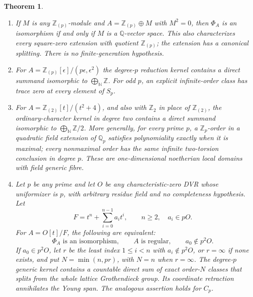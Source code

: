 \documentclass[11pt,a4paper]{article}
\newtheorem{theorem}{Theorem}[section]
\theoremstyle{definition}\newtheorem{definition}[theorem]{Definition}
\theoremstyle{remark}\newtheorem{remark}[theorem]{Remark}
\newcommand{\Z}{\mathbb Z}\newcommand{\Q}{\mathbb Q}
\begin{document}
\begin{theorem}
\begin{enumerate}[label=\textup{(\roman*)}]
degree-$p$ reduction and generic kernels, detected by an additive
homomorphism annihilating the Young span
(Corollary~\ref{thm:all-dvr-odd-dual}).  No split-summand conclusion
is asserted by that unrestricted theorem.
For every $n\ge2$ and $O=\Z_{(p)}$ or $\Z_p$, the degree-$p$
reduction kernel for $O[e]/(e^n)$ contains a split countable direct
sum of copies of $\Z/n$.  The explicit cyclic classes and their
inductions have exact order $n$ and vanish after inverting $p$.  More generally, for any mixed-characteristic DVR $O$ with
$h=v_O(p)$, the same split conclusion holds when $(n,h)=1$,
and generation fails whenever $n\nmid h$.
\item If $M$ is any $\Z_{(p)}$-module and
$A=\Z_{(p)}\oplus M$ with $M^2=0$, then $\Phi_A$ is an isomorphism
if and only if $M$ is a $\Q$-vector space.  This also characterizes
every square-zero extension with quotient $\Z_{(p)}$; the extension
has a canonical splitting.  There is no finite-generation hypothesis.
\item For $A=\Z_{(p)}[\epsilon]/(p\epsilon,\epsilon^2)$ the degree-$p$
reduction kernel contains a direct summand isomorphic to
$\bigoplus_{\mathbb N}\Z$.  For odd $p$, an explicit infinite-order
class has trace zero at every element of $S_p$.
\item For $A=\Z_{(2)}[t]/(t^2+4)$, and also with $\Z_2$ in place of
$\Z_{(2)}$, the ordinary-character kernel in degree two contains a
direct summand isomorphic to $\bigoplus_{\mathbb N}\Z/2$.
More generally, for every prime $p$, a $\Z_p$-order in a quadratic field extension of $\Q_p$
satisfies polynomiality
exactly when it is maximal; every nonmaximal order has the same infinite
two-torsion conclusion in degree $p$.  These are one-dimensional noetherian local
domains with field generic fibre.
\item Let $p$ be any prime and let $O$ be any characteristic-zero
DVR whose uniformizer is $p$, with arbitrary residue field and no
completeness hypothesis.  Let
\[
 F=t^n+\sum_{i=0}^{n-1}a_it^i,\qquad n\ge2,\quad a_i\in pO.
\]
For $A=O[t]/F$, the following are equivalent:
\[
 \Phi_A\text{ is an isomorphism},\qquad A\text{ is regular},
 \qquad a_0\notin p^2O.
\]
If $a_0\in p^2O$, let $r$ be the least index $1\le i<n$
with $a_i\notin p^2O$, or $r=\infty$ if none exists, and put
$N=\min(n,pr)$, with $N=n$ when $r=\infty$.
The degree-$p$ generic kernel contains a countable direct sum of
exact order-$N$ classes that splits from the whole lattice
Grothendieck group.  Its coordinate retraction annihilates the
Young span.  The analogous assertion holds for $C_p$.

\end{enumerate}
\end{theorem}
\end{document}
